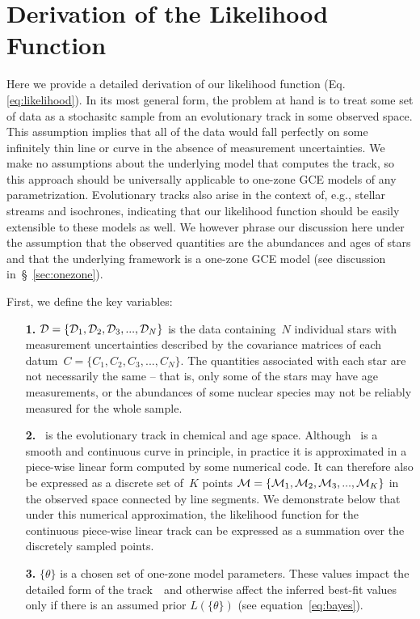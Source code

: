 \documentclass[foo.tex]{subfiles}
\begin{document}
\renewcommand\theequation{\thesection\arabic{equation}}
\renewcommand\thefigure{\thesection\arabic{figure}}
\setcounter{equation}{0}
\setcounter{figure}{0}

\section{Derivation of the Likelihood Function}
\label{sec:likelihood}

Here we provide a detailed derivation of our likelihood function (Eq.
\ref{eq:likelihood}).
In its most general form, the problem at hand is to treat some set of data as a
stochasitc sample from an evolutionary track in some observed space.
This assumption implies that all of the data would fall perfectly on some
infinitely thin line or curve in the absence of measurement uncertainties.
We make no assumptions about the underlying model that computes the track, so
this approach should be universally applicable to one-zone GCE models of any
parametrization.
Evolutionary tracks also arise in the context of, e.g., stellar streams and
isochrones, indicating that our likelihood function should be easily extensible
to these models as well.
We however phrase our discussion here under the assumption that the observed
quantities are the abundances and ages of stars and that the underlying
framework is a one-zone GCE model (see discussion in~\S~\ref{sec:onezone}).
\par
First, we define the key variables:
\begin{itemize}

	\item[\textbf{1.}] $\mathcal{D} = \{\mathcal{D}_1, \mathcal{D}_2,
	\mathcal{D}_3, ..., \mathcal{D}_N\}$ is the data containing~$N$ individual
	stars with measurement uncertainties described by the covariance matrices
	of each datum~$C = \{C_1, C_2, C_3, ..., C_N\}$.
	The quantities associated with each star are not necessarily the same --
	that is, only some of the stars may have age measurements, or the
	abundances of some nuclear species may not be reliably measured for the
	whole sample.

	\item[\textbf{2.}] ~is the evolutionary track in chemical and age
	space.
	Although~ is a smooth and continuous curve in principle, in
	practice it is approximated in a piece-wise linear form computed by some
	numerical code.
	It can therefore also be expressed as a discrete set of~$K$ points
	$\mathcal{M} = \{\mathcal{M}_1, \mathcal{M}_2, \mathcal{M}_3, ...,
	\mathcal{M}_K\}$ in the observed space connected by line segments.
	We demonstrate below that under this numerical approximation, the
	likelihood function for the continuous piece-wise linear track can be
	expressed as a summation over the discretely sampled points.

	\item[\textbf{3.}] $\{\theta\}$ is a chosen set of one-zone model
	parameters.
	These values impact the detailed form of the track~~and otherwise
	affect the inferred best-fit values only if there is an assumed prior
	$L(\{\theta\})$ (see equation~\ref{eq:bayes}).

\end{itemize}
\end{document}

